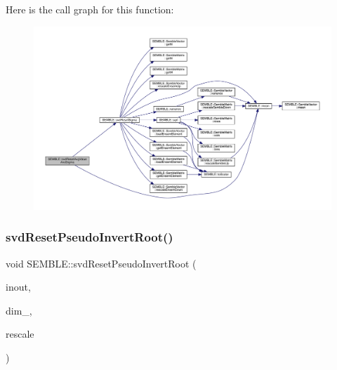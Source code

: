 Here is the call graph for this function\+:
\nopagebreak
\begin{figure}[H]
\begin{center}
\leavevmode
\includegraphics[width=350pt]{d7/dfd/namespaceSEMBLE_a236bc079d6aa849513a7ea270a9116b4_cgraph}
\end{center}
\end{figure}
\mbox{\label{namespaceSEMBLE_a609d3c49c36408c280b11e2b5a8a5395}} 
\subsubsection{\texorpdfstring{svdResetPseudoInvertRoot()}{svdResetPseudoInvertRoot()}}
{\footnotesize\ttfamily void S\+E\+M\+B\+L\+E\+::svd\+Reset\+Pseudo\+Invert\+Root (\begin{DoxyParamCaption}\item[{\mbox{\hyperlink{structSEMBLE_1_1SembleVector}{Semble\+Vector}}$<$ double $>$ \&}]{inout,  }\item[{const int}]{dim\+\_\+,  }\item[{const bool}]{rescale }\end{DoxyParamCaption})}

